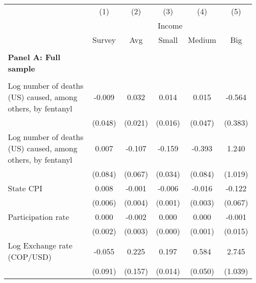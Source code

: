 \begin{tabular}{lccccc} \\ \hline 
                    &\multicolumn{1}{c}{(1)}         &\multicolumn{1}{c}{(2)}         &\multicolumn{1}{c}{(3)}         &\multicolumn{1}{c}{(4)}         &\multicolumn{1}{c}{(5)}         \\
 & \multicolumn{5}{c}{Income} \\ \cline{2-6} & Survey & Avg &  \multicolumn{1}{c}{Small} & \multicolumn{1}{c}{Medium}& \multicolumn{1}{c}{Big} \\ \hline   &  &  &  &  &  \\ \textbf{Panel A: Full sample} \\ & & & & & \\
Log number of deaths (US) caused, among others, by fentanyl&      -0.009         &       0.032         &       0.014         &       0.015         &      -0.564         \\
                    &     (0.048)         &     (0.021)         &     (0.016)         &     (0.047)         &     (0.383)         \\
\addlinespace
Log number of deaths (US) caused, among others, by fentanyl&       0.007         &      -0.107         &      -0.159\sym{***}&      -0.393\sym{***}&       1.240         \\
                    &     (0.084)         &     (0.067)         &     (0.034)         &     (0.084)         &     (1.019)         \\
\addlinespace
State CPI           &       0.008         &      -0.001         &      -0.006\sym{***}&      -0.016\sym{***}&      -0.122         \\
                    &     (0.006)         &     (0.004)         &     (0.001)         &     (0.003)         &     (0.067)         \\
\addlinespace
Participation rate  &       0.000         &      -0.002         &       0.000         &       0.000         &      -0.001         \\
                    &     (0.002)         &     (0.003)         &     (0.000)         &     (0.001)         &     (0.015)         \\
\addlinespace
Log Exchange rate (COP/USD)&      -0.055         &       0.225         &       0.197\sym{***}&       0.584\sym{***}&       2.745\sym{**} \\
                    &     (0.091)         &     (0.157)         &     (0.014)         &     (0.050)         &     (1.039)         \\

\end{tabular}
